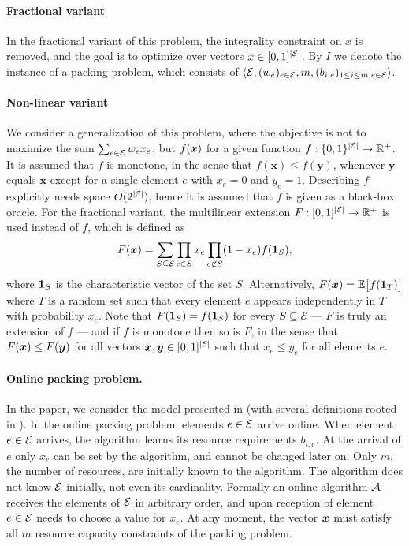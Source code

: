 \paragraph{Fractional variant}
In the fractional variant of this problem, the integrality constraint on $x$ is removed, and the goal is to optimize over vectors $x\in[0,1]^{|\cal E|}$.
By $I$ we denote the instance of a packing problem, which consists of $\langle {\cal E}, (w_e)_{e\in \cal E}, m, (b_{i,e})_{1\leq i\leq m, e\in\cal E}\rangle$.

\paragraph{Non-linear variant} We consider a generalization of this problem, where the objective is not to maximize the sum $\sum_{e\in\cal E} w_e x_e$, but $f(\bm{x})$ for a given function $f:\{0,1\}^{|\cal E|} \rightarrow {\mathbb R}^+$.  It is assumed that $f$ is monotone, in the sense that $f(\textbf{x})\leq f(\textbf{y})$, whenever $\textbf{y}$ equals $\textbf{x}$ except for a single element $e$ with $x_e=0$ and $y_e=1$. Describing $f$ explicitly needs space $O(2^{|{\cal E}|})$, hence it is assumed that $f$ is given as a black-box oracle.  For the fractional variant, the multilinear extension $F:[0,1]^{|\cal E|} \rightarrow {\mathbb R}^+$ is used instead of $f$, which is defined as
\[
    F(\bm{x}) = \sum_{S\subseteq \cal E} \prod_{e\in S} x_e \prod_{e\not\in S}(1-x_e) f(\bm{1}_S),
\]  
where $\bm{1}_S$ is the characteristic vector of the set $S$. 
Alternatively, $F(\bm{x}) = \mathbb{E} \bigl[ f(\bm{1}_{T})\bigr]$ where $T$ is a random set 
such that every element $e$ appears independently in $T$ with probability $x_{e}$. 
Note that $F(\bm{1}_{S}) = f(\bm{1}_{S})$ for every $S \subseteq \mathcal{E}$ --- $F$ is truly an extension of $f$ --- and if $f$ is monotone then so is $F$, in the sense that $F(\bm{x})\leq F(\bm{y})$ for all vectors $\bm{x},\bm{y}\in[0,1]^{|\cal E|}$ such that $x_e \leq y_e$ for all elements $e$.

\paragraph{Online packing problem.} In the paper, we consider the model presented in \cite{BamasMaggiori20:The-Primal-Dual-method} 
(with several definitions rooted in \cite{LykourisVassilvtiskii18:Competitive-caching,KumarPurohit18:Improving-online}). In the online packing problem, elements $e\in\cal E$ arrive online. When element $e\in\cal E$ arrives, the algorithm learns its resource requirements $b_{i,e}$. At the arrival of $e$ only $x_e$ can be set by the algorithm, and cannot be changed later on.  Only $m$, the number of resources, are initially known to the algorithm.  The algorithm does not know $\cal E$ initially, not even its cardinality.  Formally an online algorithm $\cal A$ receives the elements of $\cal E$ in arbitrary order, and upon reception of element $e\in\cal E$ needs to choose a value for $x_e$.  At any moment, the vector $\bm{x}$ must satisfy all $m$ resource capacity constraints of the packing problem.  

